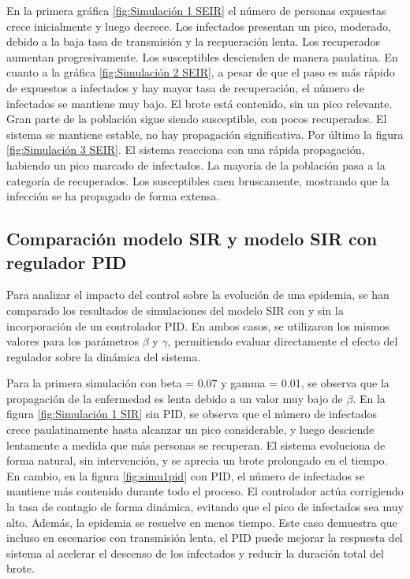 En la primera gráfica \ref{fig:Simulación 1 SEIR} el número de personas expuestas crece inicialmente y luego decrece. Los infectados presentan un pico, moderado, debido a la baja tasa de transmisión y la recpueración lenta. Los recuperados aumentan progresivamente. Los susceptibles descienden de manera paulatina. En cuanto a la gráfica \ref{fig:Simulación 2 SEIR}, a pesar de que el paso es más rápido de expuestos a infectados y hay mayor tasa de recuperación, el número de infectados se mantiene muy bajo. El brote está contenido, sin un pico relevante. Gran parte de la población sigue siendo susceptible, con pocos recuperados. El sistema se mantiene estable, no hay propagación significativa. Por último la figura \ref{fig:Simulación 3 SEIR}. El sistema reacciona con una rápida propagación, habiendo un pico marcado de infectados.
La mayoría de la población pasa a la categoría de recuperados.
Los susceptibles caen bruscamente, mostrando que la infección se ha propagado de forma extensa.

\subsection{Comparación modelo SIR y modelo SIR con regulador PID}
Para analizar el impacto del control sobre la evolución de una epidemia, se han comparado los resultados de simulaciones del modelo SIR con y sin la incorporación de un controlador PID. En ambos casos, se utilizaron los mismos valores para los parámetros $\beta$ y $\gamma$, permitiendo evaluar directamente el efecto del regulador sobre la dinámica del sistema.

Para la primera simulación con beta = 0.07 y gamma = 0.01, se observa que la propagación de la enfermedad es lenta debido a un valor muy bajo de $\beta$. En la figura \ref{fig:Simulación 1 SIR} sin PID, se observa que el número de infectados crece paulatinamente hasta alcanzar un pico considerable, y luego desciende lentamente a medida que más personas se recuperan. El sistema evoluciona de forma natural, sin intervención, y se aprecia un brote prolongado en el tiempo. En cambio, en la figura \ref{fig:simu1pid} con PID, el número de infectados se mantiene más contenido durante todo el proceso. El controlador actúa corrigiendo la tasa de contagio de forma dinámica, evitando que el pico de infectados sea muy alto. Además, la epidemia se resuelve en menos tiempo. Este caso demuestra que incluso en escenarios con transmisión lenta, el PID puede mejorar la respuesta del sistema al acelerar el descenso de los infectados y reducir la duración total del brote.

